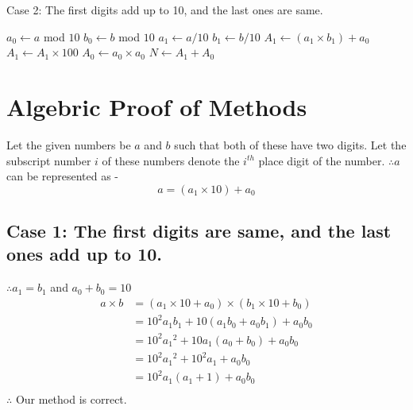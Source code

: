 \documentclass[12pt]{article}
\begin{document}
\begin{enumerate}

  \begin{algorithm}[H]
   \caption{Case 2: The first digits add up to 10, and the last ones are same.}
    \begin{algorithmic}[1]
       

        \State $a_0 \leftarrow a$ mod $10$
        \State $b_0 \leftarrow b$ mod $10$
        \State $a_1 \leftarrow a/10$
        \State $b_1 \leftarrow b/10$
            \Else 
                \State $A_1 \leftarrow (a_1 \times b_1) + a_0$
                \State $A_1 \leftarrow A_1 \times 100$
        		\State $A_0 \leftarrow a_0 \times a_0$
        		\State $N \leftarrow A_1 + A_0$
        	\EndIf

       \EndFunction

\end{algorithmic}
\end{algorithm}
\end{enumerate}


\section{Algebric Proof of Methods}
Let the given numbers be $a$ and $b$ such that both of these have two digits. Let the subscript number $i$ of these numbers denote the $i^{th}$ place digit of the number.\newline
$\therefore a$ can be represented as - 
$$a = (a_1 \times 10) + a_0$$

\subsection{Case 1: The first digits are same, and the last ones add up to 10.}
$\therefore a_1 = b_1$ and $a_0 + b_0 = 10$
\begin{align*}
a \times b &= (a_1 \times 10 + a_0) \times (b_1 \times 10 + b_0)\\
&= 10^2a_1b_1 + 10(a_1b_0 + a_0b_1) + a_0b_0\\
&= 10^2{a_1}^2 + 10a_1(a_0 + b_0) + a_0b_0\\
&= 10^2{a_1}^2 + 10^2a_1 + a_0b_0\\
&= 10^2a_1(a_1 + 1) + a_0b_0\\
\end{align*}
$\therefore$ Our method is correct.
\end{document}
